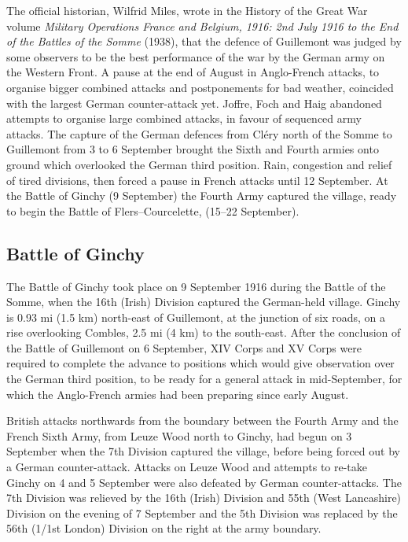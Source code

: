 \documentclass[a4paper,]{book}
\begin{document}
The official historian, Wilfrid Miles, wrote in the History of the Great War volume \textit{Military Operations France and Belgium, 1916: 2nd July 1916 to the End of the Battles of the Somme} (1938), that the defence of Guillemont was judged by some observers to be the best performance of the war by the German army on the Western Front. A pause at the end of August in Anglo-French attacks, to organise bigger combined attacks and postponements for bad weather, coincided with the largest German counter-attack yet. Joffre, Foch and Haig abandoned attempts to organise large combined attacks, in favour of sequenced army attacks. The capture of the German defences from Cléry north of the Somme to Guillemont from 3 to 6 September brought the Sixth and Fourth armies onto ground which overlooked the German third position. Rain, congestion and relief of tired divisions, then forced a pause in French attacks until 12 September. At the Battle of Ginchy (9 September) the Fourth Army captured the village, ready to begin the Battle of Flers–Courcelette, (15–22 September). 

\subsection{Battle of Ginchy}

The Battle of Ginchy took place on 9 September 1916 during the Battle of the Somme, when the 16th (Irish) Division captured the German-held village. Ginchy is 0.93 mi (1.5 km) north-east of Guillemont, at the junction of six roads, on a rise overlooking Combles, 2.5 mi (4 km) to the south-east. After the conclusion of the Battle of Guillemont on 6 September, XIV Corps and XV Corps were required to complete the advance to positions which would give observation over the German third position, to be ready for a general attack in mid-September, for which the Anglo-French armies had been preparing since early August.

British attacks northwards from the boundary between the Fourth Army and the French Sixth Army, from Leuze Wood north to Ginchy, had begun on 3 September when the 7th Division captured the village, before being forced out by a German counter-attack. Attacks on Leuze Wood and attempts to re-take Ginchy on 4 and 5 September were also defeated by German counter-attacks. The 7th Division was relieved by the 16th (Irish) Division and 55th (West Lancashire) Division on the evening of 7 September and the 5th Division was replaced by the 56th (1/1st London) Division on the right at the army boundary.
\end{document}
